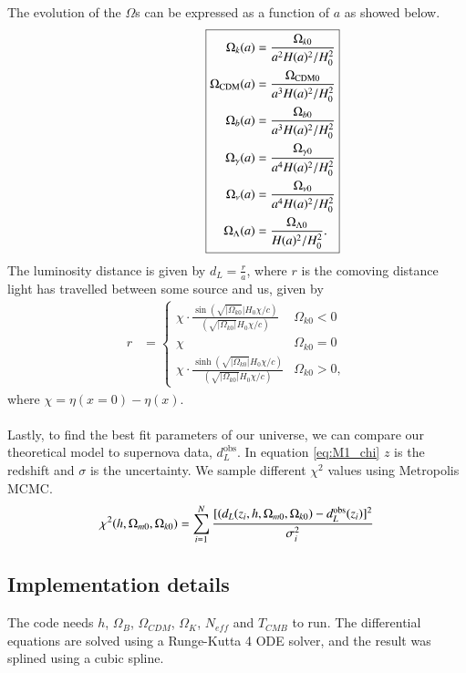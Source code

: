 \documentclass{aa}
\begin{document}
The evolution of the $\Omega$s can be expressed as a function of $a$ as showed below. 
\begin{equation}
      \hspace*{2cm}
      \boxed{
   \begin{aligned}
      \Omega_{k}(a) &= \frac{\Omega_{k0}}{a^2H(a)^2/H_0^2}\\
      \Omega_{\rm CDM}(a) &= \frac{\Omega_{\rm CDM 0}}{a^3H(a)^2/H_0^2} \\
      \Omega_b(a) &= \frac{\Omega_{b 0}}{a^3H(a)^2/H_0^2} \\
      \Omega_\gamma(a) &= \frac{\Omega_{\gamma 0}}{a^4H(a)^2/H_0^2} \\
      \Omega_{\nu}(a) &= \frac{\Omega_{\nu 0}}{a^4H(a)^2/H_0^2} \\
      \Omega_{\Lambda}(a) &= \frac{\Omega_{\Lambda 0}}{H(a)^2/H_0^2}.
   \end{aligned}
      }
\end{equation}
The luminosity distance is given by $d_L = \frac{r}{a}$, where $r$ is the comoving distance light has travelled between some source and us, given by 
$$
\boxed{
\begin{aligned}
r &= \begin{cases}
\chi \cdot \frac{\sin \left( \sqrt{|\Omega_{k 0}}| H_0 \chi /c \right)}{\left(\sqrt{|\Omega_{k 0}|}H_0\chi / c\right)} & \Omega_{k 0} < 0\\
\chi & \Omega_{k 0} =0 \\
\chi \cdot \frac{\sinh \left( \sqrt{|\Omega_{k 0}|} H_0 \chi / c\right)}{\left(\sqrt{|\Omega_{k 0}|}H_0\chi / c\right) } & \Omega_{k 0} > 0,
\end{cases}
\end{aligned}
}
$$
where $\chi= \eta(x=0)-\eta(x)$.\\
\\
Lastly, to find the best fit parameters of our universe, we can compare our theoretical model to supernova data, $d_L^\mathrm{obs}$. In equation \ref{eq:M1_chi} 
$z$ is the redshift and $\sigma$ is the uncertainty. We sample different $\chi^2$ values using Metropolis MCMC.
\begin{equation} \label{eq:M1_chi}
\chi^2(h,\Omega_{m0}, \Omega_{k0}) = \sum_{i=1}^N \frac{[(d_L(z_i,h,\Omega_{m0},\Omega_{k0}) - d_L^{\rm obs}(z_i)]^2 }{\sigma_i^2}
\end{equation}

\subsection{Implementation details}
The code needs $h$, $\Omega_B$, $\Omega_{CDM}$, $\Omega_K$, $N_{eff}$ and $T_{CMB}$ to run. 
The differential equations are solved using a Runge-Kutta 4 ODE solver, and the result was splined using a cubic spline.
\end{document}
